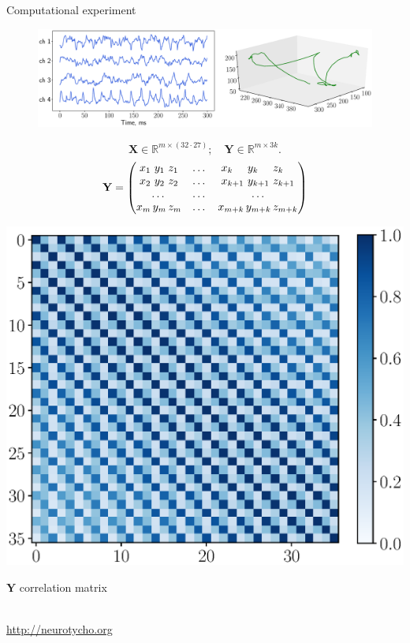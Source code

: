 \documentclass[9pt]{beamer}
\newcommand{\bY}{\mathbf{Y}}
\newcommand{\bX}{\mathbf{X}}
\newcommand{\bbR}{\mathbb{R}}
\begin{document}
\begin{frame}{Computational experiment}
\begin{figure}
	\includegraphics[width=\linewidth]{figs/ecog_data}
\end{figure}
\begin{minipage}{.55\linewidth}
\[
	\bX \in \bbR^{m \times (32 \cdot 27)}; \quad
	\bY \in \bbR^{m \times 3k}.
\]
\vspace{0.1cm}
\[
	\bY = 
	\begin{pmatrix}
	x_1 \,\, y_1 \,\, z_1 & \dots & x_{k\hphantom{+1}} \,\, y_{k\hphantom{+1}} \,\, z_{k\hphantom{+1}}\\
	x_2 \,\, y_2 \,\, z_2 & \dots & x_{k + 1} \,\, y_{k + 1} \,\, z_{k + 1}\\
	 \dots & \dots & \dots  \\
	x_m \, y_m \, z_m & \dots & x_{m + k} \, y_{m + k} \, z_{m + k}
	\end{pmatrix}
\]
\end{minipage}%
\begin{minipage}{.43\linewidth}
	\includegraphics[width=\linewidth]{figs/Y_corr_matrix.eps}
	\begin{center}
		\vspace{-0.4cm}
		$\bY$ correlation matrix
		\vspace{-0.4cm}
	\end{center}
\end{minipage}
\vspace{0.5cm}

\hrulefill \\
\url{http://neurotycho.org}
\end{frame}
\end{document}
